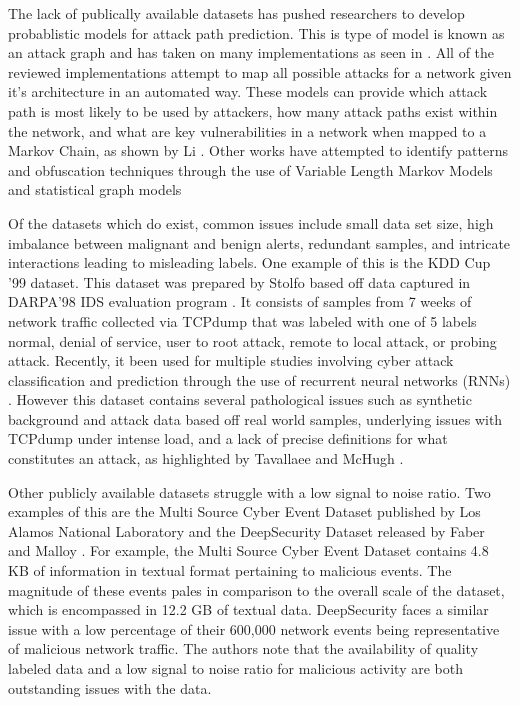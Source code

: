 The lack of publically available datasets has pushed researchers to develop probablistic models for attack path prediction. This is type of model is known as an attack graph and has taken on many implementations as seen in \cite{Qin2004, Wang2006, Noel2009}. All of the reviewed implementations attempt to map all possible attacks for a network given it's architecture in an automated way. These models can provide which attack path is most likely to be used by attackers, how many attack paths exist within the network, and what are key vulnerabilities in a network when mapped to a Markov Chain, as shown by Li \cite{Li2017}. Other works have attempted to identify patterns and obfuscation techniques through the use of Variable Length Markov Models \cite{Fava2008} and statistical graph models \cite{Du2014}


Of the datasets which do exist, common issues include small data set size, high imbalance between malignant and benign alerts, redundant samples, and intricate interactions leading to misleading labels. One example of this is the KDD Cup '99 \cite{kdd-cup} dataset. This dataset was prepared by Stolfo \etal \cite{Stolfo} based off data captured in DARPA'98 IDS evaluation program \cite{Lippmann}. It consists of samples from 7 weeks of network traffic collected via TCPdump that was labeled with one of 5 labels {normal, denial of service, user to root attack, remote to local attack, or probing attack}. Recently, it been used for multiple studies involving cyber attack classification and prediction through the use of recurrent neural networks (RNNs) \cite{Kim, Staudemeyer}. However this dataset contains several pathological issues such as synthetic background and attack data based off real world samples, underlying issues with TCPdump under intense load, and a lack of precise definitions for what constitutes an attack, as highlighted by Tavallaee \etal \cite{Tavallaee} and McHugh \cite{McHugh}.

Other publicly available datasets struggle with a low signal to noise ratio. Two examples of this are the Multi Source Cyber Event Dataset published by Los Alamos National Laboratory \cite{akent-2015-enterprise-data} and the DeepSecurity Dataset released by Faber and Malloy \cite{Faber2018}. For example, the Multi Source Cyber Event Dataset contains 4.8 KB of information in textual format pertaining to malicious events. The magnitude of these events pales in comparison to the overall scale of the dataset, which is encompassed in  12.2 GB of textual data. DeepSecurity faces a similar issue with a low percentage of their 600,000 network events being representative of malicious network traffic. The authors note that the availability of quality labeled data and a low signal to noise ratio for malicious activity are both outstanding issues with the data. 

